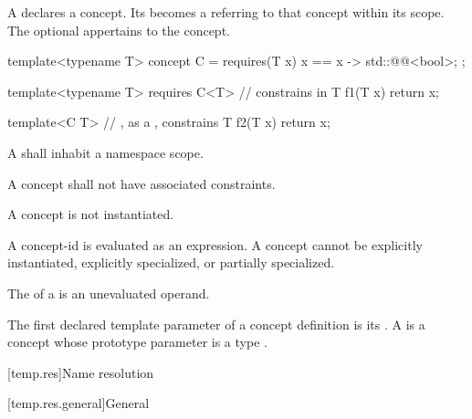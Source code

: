 \pnum
A 
declares a concept.
Its  becomes a 
referring to that concept
within its scope.
The optional  appertains to the concept.
\begin{example}
\begin{codeblock}
template<typename T>
concept C = requires(T x) {
  { x == x } -> std::@@<bool>;
};

template<typename T>
  requires C<T>     //  constrains  in 
T f1(T x) { return x; }

template<C T>       // , as a , constrains 
T f2(T x) { return x; }
\end{codeblock}
\end{example}

\pnum
A 
shall inhabit a namespace scope.

\pnum
A concept shall not have associated constraints.

\pnum
A concept is not instantiated.
\begin{note}
A concept-id is evaluated as an expression.
A concept cannot be
explicitly instantiated,
explicitly specialized,
or partially specialized.
\end{note}

\pnum
The  of a 
is an unevaluated operand.

\pnum
The first declared template parameter of a concept definition is its
.
%
A 
is a concept whose prototype parameter
is a type .

[temp.res]{Name resolution}

[temp.res.general]{General}


